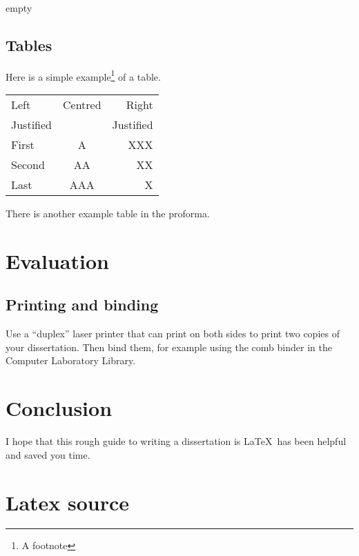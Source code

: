 \documentclass[12pt,a4paper,twoside,openright]{report}
\begin{document}
empty

\section{Tables}

\begin{samepage}
Here is a simple example\footnote{A footnote} of a table.

\begin{center}
\begin{tabular}{l|c|r}
Left      & Centred & Right \\
Justified &         & Justified \\[3mm]
First     & A       & XXX \\
Second    & AA      & XX  \\
Last      & AAA     & X   \\
\end{tabular}
\end{center}

\noindent
There is another example table in the proforma.
\end{samepage}

\chapter{Evaluation}

\section{Printing and binding}

Use a ``duplex'' laser printer that can print on both sides to print
two copies of your dissertation. Then bind them, for example using the
comb binder in the Computer Laboratory Library.

\chapter{Conclusion}

I hope that this rough guide to writing a dissertation is \LaTeX\ has
been helpful and saved you time.


\printbibliography
\appendix

\chapter{Latex source}
\end{document}
